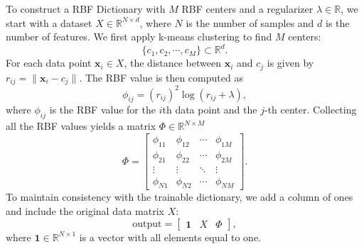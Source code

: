 To construct a RBF Dictionary
with $M$ RBF centers and a regularizer $\lambda \in \mathbb{R}$,
we start with a dataset $X \in \mathbb{R}^{N \times d}$,
where $N$ is the number of samples and
$d$ is the number of features.
We first apply k-means clustering to find $M$ centers:
\begin{equation*}
  \{c_1, c_2, \cdots, c_M\} \subset \mathbb{R}^d.
\end{equation*}
For each data point $\mathbf{x}_i \in X$,
the distance between $\mathbf{x}_i$ and $c_j$ is
given by $r_{ij} = \|\mathbf{x}_i - c_j\|$.
The RBF value is then computed as
\begin{equation*}
  \phi_{ij} = (r_{ij})^2 \log(r_{ij} + \lambda),
\end{equation*}
where $\phi_{ij}$ is the RBF value for the
$i$th data point and the $j$-th center.
Collecting all the RBF values yields a matrix $\Phi \in \mathbb{R}^{N \times M}$
\begin{equation*}
  \Phi = \left[
    \begin{array}{cccc}
      \phi_{11}&\phi_{12}&\cdots&\phi_{1M}\\
      \phi_{21}&\phi_{22}&\cdots&\phi_{2M}\\
      \vdots & \vdots & \ddots & \vdots\\
      \phi_{N1}&\phi_{N2}&\cdots&\phi_{NM}
    \end{array}
  \right].
\end{equation*}
To maintain consistency with the trainable dictionary,
we add a column of ones and
include the original data matrix $X$:
\begin{equation*}
  \text{output} = \left[
    \begin{array}{ccc}
      \mathbf{1}&X&\Phi
    \end{array}
  \right],
\end{equation*}
where $\mathbf{1} \in \mathbb{R}^{N\times 1}$ is a vector with all elements
equal to one.
